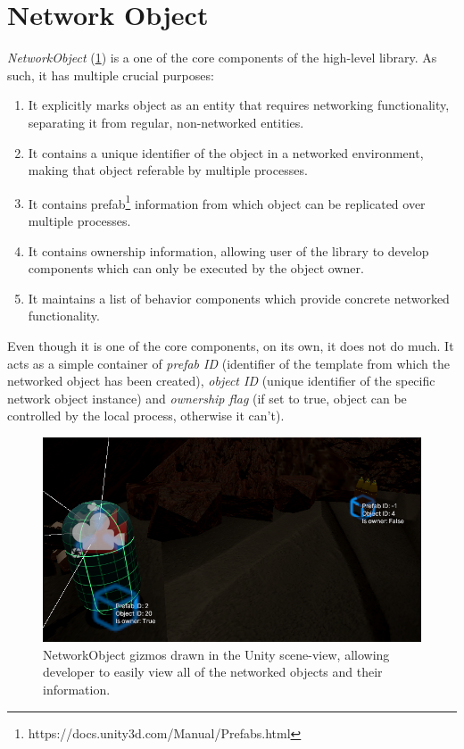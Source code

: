 \documentclass[times, utf8, diplomski]{fer}
\begin{document}
\section{Network Object}
\textit{NetworkObject} (\ref{fig:network-object-example}) is a one of the core components of the high-level library. As such, it has multiple crucial purposes:

\begin{enumerate}
	\item It explicitly marks object as an entity that requires networking functionality, separating it from regular, non-networked entities.
	\item It contains a unique identifier of the object in a networked environment, making that object referable by multiple processes.
	\item It contains prefab\footnote{https://docs.unity3d.com/Manual/Prefabs.html} information from which object can be replicated over multiple processes.
	\item It contains ownership information, allowing user of the library to develop components which can only be executed by the object owner.
	\item It maintains a list of behavior components which provide concrete networked functionality.
\end{enumerate}

Even though it is one of the core components, on its own, it does not do much. It acts as a simple container of \textit{prefab ID} (identifier of the template from which the networked object has been created), \textit{object ID} (unique identifier of the specific network object instance) and \textit{ownership flag} (if set to true, object can be controlled by the local process, otherwise it can't).

\begin{figure}[H]
	\centering
	\includegraphics[scale=0.6]{NetworkObject-example}
	\caption{NetworkObject gizmos drawn in the Unity scene-view, allowing developer to easily view all of the networked objects and their information.}
	\label{fig:network-object-example}
\end{figure}
\end{document}
